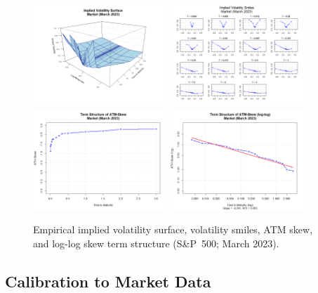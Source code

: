 \begin{figure}[H]
    \centering
    \includegraphics[width=0.45\textwidth]{figures/6.1 Market Surface/market_iv_surface.png}
    \includegraphics[width=0.45\textwidth]{figures/6.1 Market Surface/market_iv_smiles.png}
    \includegraphics[width=0.45\textwidth]{figures/6.1 Market Surface/market_atm_skew.png}
    \includegraphics[width=0.45\textwidth]{figures/6.1 Market Surface/market_atm_skew_log.png}
    \caption{Empirical implied volatility surface, volatility smiles, ATM skew, and log-log skew term structure (S\&P~500; March 2023).}
    \label{fig:MarketSurface}
\end{figure}


\subsection{Calibration to Market Data}

